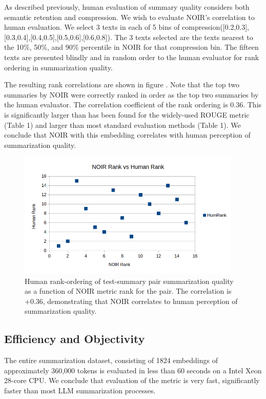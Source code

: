 \documentclass{article}
\begin{document}
{As described previously, human evaluation of summary quality considers both semantic retention and compression.  
We wish to evaluate NOIR's correlation to human evaluation.  
We select 3 texts in each of 5 bins of compression([0.2,0.3],[0.3,0.4],[0.4,0.5],[0.5,0.6],[0.6,0.8]).  
The 3 texts selected  are the texts nearest to the 10\%, 50\%, and 90\% percentile
in NOIR for that compression bin.
The fifteen texts are presented blindly and in random order to the human evaluator for rank ordering in summarization quality.

The resulting rank correlations are shown in figure  .
Note that the top two summaries by NOIR were correctly ranked in order as the top
two summaries by the human evaluator.  
The correlation coefficient of the rank ordering is 0.36.
This is significantly larger than has been found for the widely-used ROUGE metric \citep{5071230} (Table 1) and larger than most
standard evaluation methods \citep{supert} (Table 1).
We conclude that NOIR with this embedding correlates with human perception of summarization quality.

\begin{figure}
	\centering
	\includegraphics[height=6cm]{humaneval.png}
	\caption{Human rank-ordering of test-summary pair summarization quality as a function of NOIR metric rank for the pair.  The correlation is +0.36, demonstrating that NOIR correlates to human perception of summarization quality.}
	\label{fig:humaneval}
\end{figure}

\subsection{Efficiency and Objectivity}

The entire summarization dataset, consisting of 1824 embeddings of approximately 360,000 tokens is evaluated in less than 60 seconds on a Intel Xeon 28-core CPU.
We conclude that evaluation of the metric is very fast, significantly faster than most LLM summarization processes.

}
\end{document}
